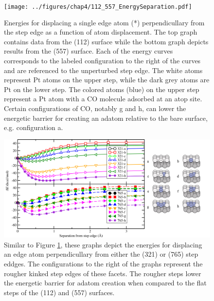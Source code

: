 \begin{figure}
  \texttt{[image: ../figures/chap4/112\_557\_EnergySeparation.pdf]}
  \caption{Energies for displacing a single edge atom (*) perpendicullary from
the step edge as a function of atom displacement. The top graph contains data from the
(112) surface while the bottom graph depicts results from the (557) surface.
Each of the energy curves corresponds to the labeled configuration to the right of the curves
and are referenced to the unperturbed step edge. The white atoms represent Pt
atoms on the upper step, while the dark grey atoms are Pt on the lower step.
The colored atoms (blue) on the upper step represent a Pt atom with a CO
molecule adsorbed at an atop site. Certain configurations of CO, notably g and
h, can lower the energetic barrier for creating an adatom relative to the bare
surface, e.g. configuration a.}
\label{fig:112_557_ES}
\end{figure}

\begin{figure}
  \includegraphics[width=\linewidth]{../figures/chap4/321_765_EnergySeparation.pdf}
  \caption{Similar to Figure \ref{fig:112_557_ES}, these graphs depict the
energies for displacing an edge atom perpendicullary from either the (321) or
(765) step eddges. The configurations to the right of the graphs represent the
rougher kinked step edges of these facets. The rougher steps lower the 
energetic barrier for adatom creation when compared to the flat steps of the
(112) and (557) surfaces.}
\label{fig:321_765_ES}
\end{figure}

